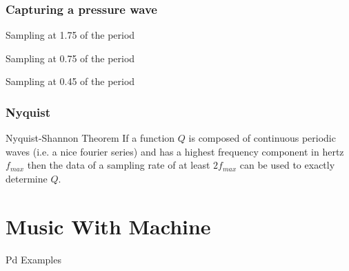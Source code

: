 \documentclass[10pt,unknownkeysallowed]{beamer}
\begin{document}
\begin{frame}
\frametitle{Capturing a pressure wave}
\begin{block}{Sampling at 1.75 of the period}
\end{block}

\begin{block}{Sampling at 0.75 of the period}
\end{block}

\begin{block}{Sampling at 0.45 of the period}
\end{block}
\end{frame}

\begin{frame}
\frametitle{Nyquist}

\begin{block}{Nyquist-Shannon Theorem}
If a function $Q$ is composed of continuous periodic waves (i.e. a nice fourier series) and has a highest frequency component in hertz  $f_{max}$ then the data of a sampling rate of at least $2f_{max}$ can be used to exactly determine $Q$.
\end{block}

\end{frame}


\section{Music With Machine}
\begin{frame}
 Pd Examples
 \end{frame}
 
\end{document}
